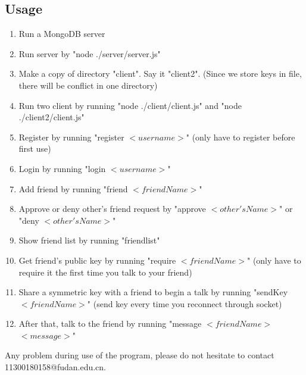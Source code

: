 \documentclass[11pt]{article}
\begin{document}
\subsection{Usage}
\begin{enumerate}
\item Run a MongoDB server
\item Run server by "node ./server/server.js"
\item Make a copy of directory "client". Say it "client2". (Since we store keys in file, there will be conflict in one directory)
\item Run two client by running "node ./client/client.js" and "node ./client2/client.js"
\item Register by running "register $<username>$" (only have to register before first use)
\item Login by running "login $<username>$"
\item Add friend by running "friend $<friendName>$"
\item Approve or deny other's friend request by "approve $<other'sName>$" or "deny $<other'sName>$"
\item Show friend list by running "friendlist"
\item Get friend's public key by running "require $<friendName>$" (only have to require it the first time you talk to your friend)
\item Share a symmetric key with a friend to begin a talk by running "sendKey $<friendName>$" (send key every time you reconnect through socket)
\item After that, talk to the friend by running "message $<friendName>$ $<message>$"
\end{enumerate}
Any problem during use of the program, please do not hesitate to contact 11300180158@fudan.edu.cn.
\end{document}
